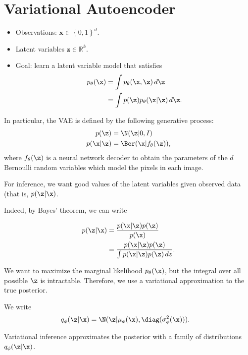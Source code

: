 \section{Variational Autoencoder}


\begin{itemize}
  \item Observations: $\mathbf{x} \in \left\{ 0, 1 \right\}^d$.
  \item Latent variables $\mathbf{z} \in \mathbb{R}^k$.
  \item Goal: learn a latent variable model that satisfies
    \begin{align*}
      p_{\theta}(\x) &= \int p_{\theta} (\x, \z) \, d\z \\
      &= \int p(\z) p_{\theta} (\x | \z) \, d\z.
    \end{align*}
\end{itemize}

In particular, the VAE is defined by the following generative process:
\begin{align*}
  p(\z) &= \N(\z | 0, I) \\
  p(\x | \z) &= \Ber(\x | f_{\theta}(\z)),
 \end{align*}
where $f_{\theta}(\z)$ is a neural network decoder to obtain the parameters of the $d$ Bernoulli random variables which model the pixels in each image.

For inference, we want good values of the latent variables given observed data (that is, $p(\z | \x)$. 
  
Indeed, by Bayes' theorem, we can write

\begin{align*}
  p(\z | \x) &= \frac{p(\x | \z) p(\z)}{p(\x)} \\
  &= \frac{p(\x | \z) p(\z)}{\int p(\x | \z) p (\z) \, dz}.
\end{align*}

We want to maximize the marginal likelihood $p_{\theta}(\x)$, but the integral over all possible $\z$ is intractable.  Therefore, we use a variational approximation to the true posterior.

We write
\begin{align*}
  q_{\phi}(\z | \x) &= \N(\z | \mu_{\phi}(\x), \diag(\sigma^2_{\phi}(\x))).
\end{align*}

Variational inference approximates the posterior with a family of distributions $q_{\phi}(\z | \x)$.

